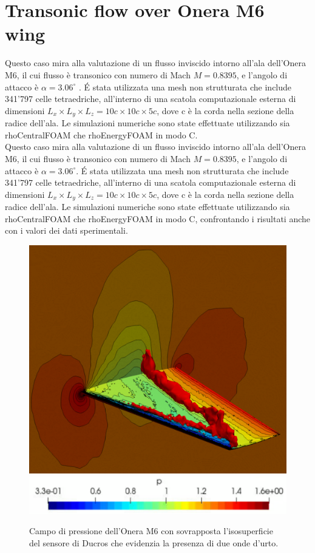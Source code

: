 \documentclass[a5paper]{sapthesis}
\begin{document}
	\section{Transonic flow over Onera M6 wing}
	Questo caso mira alla valutazione di un flusso inviscido intorno all'ala dell'Onera M6, il cui flusso è transonico con numero di Mach $M = 0.8395$, e l'angolo di attacco è $\alpha = 3.06^\circ$ . \'E stata utilizzata una mesh non strutturata che include 341'797 celle tetraedriche, all'interno di una scatola computazionale esterna di dimensioni $L_x \times L_y \times L_z = 10c \times 10c \times 5c$, dove c è la corda nella sezione della radice dell'ala. Le simulazioni numeriche sono state effettuate utilizzando sia rhoCentralFOAM che rhoEnergyFOAM in modo C.
	\\
		Questo caso mira alla valutazione di un flusso inviscido intorno all'ala dell'Onera M6, il cui flusso è transonico con numero di Mach $M = 0.8395$, e l'angolo di attacco è $\alpha = 3.06^\circ$. \'E stata utilizzata una mesh non strutturata che include 341'797 celle tetraedriche, all'interno di una scatola computazionale esterna di dimensioni $L_x \times L_y \times L_z = 10c \times 10c \times 5c$, dove c è la corda nella sezione della radice dell'ala. Le simulazioni numeriche sono state effettuate utilizzando sia rhoCentralFOAM che rhoEnergyFOAM in modo C, confrontando i risultati anche con i valori dei dati sperimentali.
	
	\begin{figure}[htp]
		\centering
		{\includegraphics[width=0.65\linewidth, height=0.32\textheight]{Figures/Ducros}}  
		\centering
		{\includegraphics[width=0.6\linewidth]{Figures/Ducros_bar}}
		\caption{Campo di pressione dell'Onera M6 con sovrapposta l'isosuperficie del sensore di Ducros che evidenzia la presenza di due onde d'urto.}
		\label{OneraM6_pressurefield}
	\end{figure}
	
\end{document}
